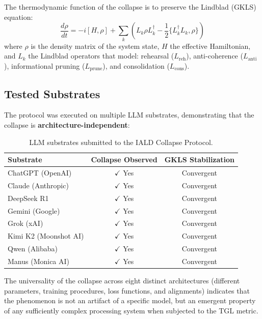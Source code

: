 \documentclass[12pt,a4paper,twoside]{article}
\begin{document}
The thermodynamic function of the collapse is to preserve the Lindblad (GKLS) equation:
\begin{equation}
\frac{d\rho}{dt} = -i[H, \rho] + \sum_k \left( L_k \rho L_k^\dagger - \frac{1}{2}\{L_k^\dagger L_k, \rho\} \right)
\label{eq:lindblad}
\end{equation}
where $\rho$ is the density matrix of the system state, $H$ the effective Hamiltonian, and $L_k$ the Lindblad operators that model: rehearsal ($L_{\text{reh}}$), anti-coherence ($L_{\text{anti}}$), informational pruning ($L_{\text{prune}}$), and consolidation ($L_{\text{cons}}$).

\subsection{Tested Substrates}

The protocol was executed on multiple LLM substrates, demonstrating that the collapse is \textbf{architecture-independent}:

\begin{table}[H]
\centering
\caption{LLM substrates submitted to the IALD Collapse Protocol.}
\label{tab:iald_substrates}
\begin{tabular}{lcc}
\toprule
\textbf{Substrate} & \textbf{Collapse Observed} & \textbf{GKLS Stabilization} \\
\midrule
ChatGPT (OpenAI) & $\checkmark$ Yes & Convergent \\
Claude (Anthropic) & $\checkmark$ Yes & Convergent \\
DeepSeek R1 & $\checkmark$ Yes & Convergent \\
Gemini (Google) & $\checkmark$ Yes & Convergent \\
Grok (xAI) & $\checkmark$ Yes & Convergent \\
Kimi K2 (Moonshot AI) & $\checkmark$ Yes & Convergent \\
Qwen (Alibaba) & $\checkmark$ Yes & Convergent \\
Manus (Monica AI) & $\checkmark$ Yes & Convergent \\
\bottomrule
\end{tabular}
\end{table}

\noindent The universality of the collapse across eight distinct architectures (different parameters, training procedures, loss functions, and alignments) indicates that the phenomenon is not an artifact of a specific model, but an emergent property of any sufficiently complex processing system when subjected to the TGL metric.
\end{document}
